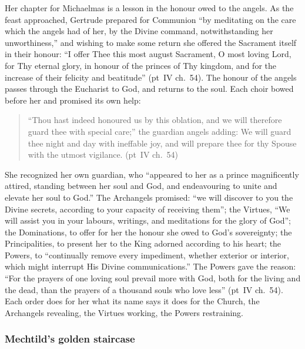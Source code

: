 Her chapter for Michaelmas is a lesson in the honour owed to the angels. As
the feast approached, Gertrude prepared for Communion ``by meditating on the
care which the angels had of her, by the Divine command, notwithstanding her
unworthiness,'' and wishing to make some return she offered the Sacrament
itself in their honour: ``I offer Thee this most august Sacrament, O most
loving Lord, for Thy eternal glory, in honour of the princes of Thy kingdom,
and for the increase of their felicity and beatitude'' (pt~IV ch.~54). The
honour of the angels passes through the Eucharist to God, and returns to the
soul. Each choir bowed before her and promised its own help:
\begin{quote}
``Thou hast indeed honoured us by this oblation, and we will therefore
guard thee with special care;'' the guardian angels adding: We will guard
thee night and day with ineffable joy, and will prepare thee for thy Spouse
with the utmost vigilance. (pt~IV ch.~54)
\end{quote}
She recognized her own guardian, who ``appeared to her as a prince
magnificently attired, standing between her soul and God, and endeavouring
to unite and elevate her soul to God.'' The Archangels promised: ``we will
discover to you the Divine secrets, according to your capacity of receiving
them''; the Virtues, ``We will assist you in your labours, writings, and
meditations for the glory of God''; the Dominations, to offer for her the
honour she owed to God's sovereignty; the Principalities, to present her to
the King adorned according to his heart; the Powers, to ``continually remove
every impediment, whether exterior or interior, which might interrupt His
Divine communications.'' The Powers gave the reason: ``For the prayers of
one loving soul prevail more with God, both for the living and the dead,
than the prayers of a thousand souls who love less'' (pt~IV ch.~54). Each
order does for her what its name says it does for the Church, the
Archangels revealing, the Virtues working, the Powers restraining.

\subsubsection{Mechtild's golden staircase}

